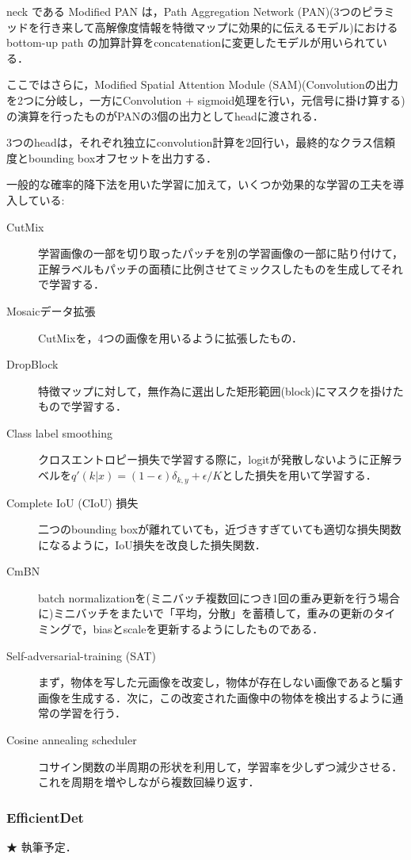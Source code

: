 \documentclass[originalpaper,fleqn]{jsaiart}     %
\begin{document}
neck である Modified PAN は，Path Aggregation Network (PAN)(3つのピラミッドを行き来して高解像度情報を特徴マップに効果的に伝えるモデル)におけるbottom-up path の加算計算をconcatenationに変更したモデルが用いられている．

ここではさらに，Modified Spatial Attention Module (SAM)(Convolutionの出力を2つに分岐し，一方にConvolution + sigmoid処理を行い，元信号に掛け算する)の演算を行ったものがPANの3個の出力としてheadに渡される．

3つのheadは，それぞれ独立にconvolution計算を2回行い，最終的なクラス信頼度とbounding boxオフセットを出力する．

一般的な確率的降下法を用いた学習に加えて，いくつか効果的な学習の工夫を導入している: 

\begin{description}
    \item[CutMix] 学習画像の一部を切り取ったパッチを別の学習画像の一部に貼り付けて，正解ラベルもパッチの面積に比例させてミックスしたものを生成してそれで学習する．
    \item[Mosaicデータ拡張] CutMixを，4つの画像を用いるように拡張したもの．
    \item[DropBlock] 特徴マップに対して，無作為に選出した矩形範囲(block)にマスクを掛けたもので学習する．
    \item[Class label smoothing] クロスエントロピー損失で学習する際に，logitが発散しないように正解ラベルを$q'(k|x)=(1-\epsilon)\delta_{k,y}+\epsilon/K$とした損失を用いて学習する．
    \item[Complete IoU (CIoU) 損失] 二つのbounding boxが離れていても，近づきすぎていても適切な損失関数になるように，IoU損失を改良した損失関数．
    \item[CmBN] batch normalizationを(ミニバッチ複数回につき1回の重み更新を行う場合に)ミニバッチをまたいで「平均，分散」を蓄積して，重みの更新のタイミングで，biasとscaleを更新するようにしたものである．
    \item[Self-adversarial-training (SAT)] まず，物体を写した元画像を改変し，物体が存在しない画像であると騙す画像を生成する．次に，この改変された画像中の物体を検出するように通常の学習を行う．
    \item[Cosine annealing scheduler] コサイン関数の半周期の形状を利用して，学習率を少しずつ減少させる．これを周期を増やしながら複数回繰り返す．
\end{description}
\subsubsection{EfficientDet}
★ 執筆予定．
\end{document}

